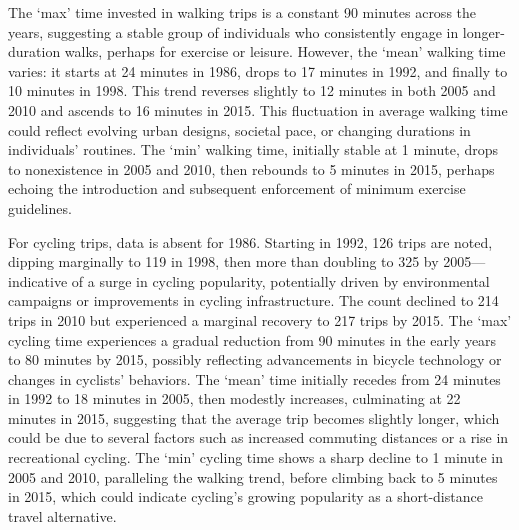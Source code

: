 \documentclass[
11pt, %
oneside, %
english, %
singlespacing, %
]{macthesis} %
\begin{document}
The `max' time invested in walking trips is a constant 90 minutes across the years, suggesting a stable group of individuals who consistently engage in longer-duration walks, perhaps for exercise or leisure. However, the `mean' walking time varies: it starts at 24 minutes in 1986, drops to 17 minutes in 1992, and finally to 10 minutes in 1998. This trend reverses slightly to 12 minutes in both 2005 and 2010 and ascends to 16 minutes in 2015. This fluctuation in average walking time could reflect evolving urban designs, societal pace, or changing durations in individuals' routines. The `min' walking time, initially stable at 1 minute, drops to nonexistence in 2005 and 2010, then rebounds to 5 minutes in 2015, perhaps echoing the introduction and subsequent enforcement of minimum exercise guidelines.

For cycling trips, data is absent for 1986. Starting in 1992, 126 trips are noted, dipping marginally to 119 in 1998, then more than doubling to 325 by 2005---indicative of a surge in cycling popularity, potentially driven by environmental campaigns or improvements in cycling infrastructure. The count declined to 214 trips in 2010 but experienced a marginal recovery to 217 trips by 2015. The `max' cycling time experiences a gradual reduction from 90 minutes in the early years to 80 minutes by 2015, possibly reflecting advancements in bicycle technology or changes in cyclists' behaviors. The `mean' time initially recedes from 24 minutes in 1992 to 18 minutes in 2005, then modestly increases, culminating at 22 minutes in 2015, suggesting that the average trip becomes slightly longer, which could be due to several factors such as increased commuting distances or a rise in recreational cycling. The `min' cycling time shows a sharp decline to 1 minute in 2005 and 2010, paralleling the walking trend, before climbing back to 5 minutes in 2015, which could indicate cycling's growing popularity as a short-distance travel alternative.
\end{document}
